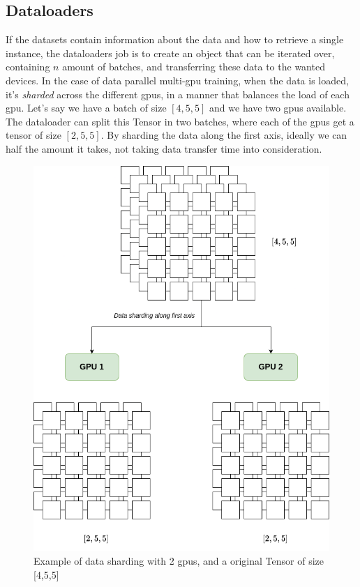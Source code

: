 \subsection{Dataloaders}

If the datasets contain information about the data and how to retrieve a single instance, the dataloaders job is to create an object that can be iterated over, containing $n$ amount of batches, and transferring these data to the wanted devices. In the case of data parallel multi-gpu training, when the data is loaded, it's \textit{sharded} across the different gpus, in a manner that balances the load of each gpu. Let's say we have a batch  of size $[4, 5, 5]$ and we have two gpus available. The dataloader can split this Tensor in two batches, where each of the gpus get a tensor of size $[2, 5, 5]$. By sharding the data along the first axis, ideally we can half the amount it takes, not taking data transfer time into consideration. 

\begin{figure}[h]
    \centering
    \includegraphics[scale=0.2]{figures/sharding.png}
    \caption{Example of data sharding with 2 gpus, and a original Tensor of size [4,5,5]}
    \label{fig:sharding}
\end{figure}


